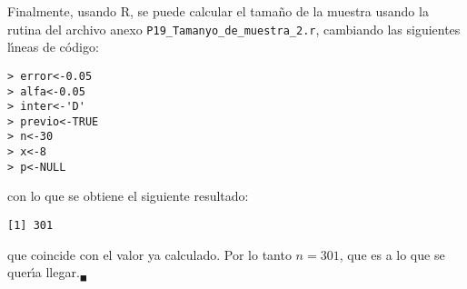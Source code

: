 \begin{solucion}
 \par 
 Finalmente, usando R, se puede calcular el tama\~no de la muestra usando la rutina del archivo anexo \texttt{P19\_Tamanyo\_de\_muestra\_2.r}, cambiando las siguientes l\'{\i}neas de c\'odigo:
 \begin{verbatim}
> error<-0.05
> alfa<-0.05
> inter<-'D'
> previo<-TRUE
> n<-30
> x<-8
> p<-NULL
 \end{verbatim}
 \vspace{-0.5cm}
 con lo que se obtiene el siguiente resultado:
 \begin{verbatim}
[1] 301
 \end{verbatim}
 \vspace{-0.5cm}
 que coincide con el valor ya calculado. Por lo tanto $n = 301$, que es a lo que se quer\'{\i}a llegar.${}_{\blacksquare}$
\end{solucion}
